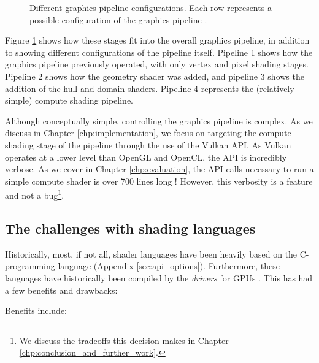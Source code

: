 \documentclass[a4paper,12pt,twoside,openright]{report}
\begin{document}
\begin{figure}[h]
\centering
\def\svgwidth{\linewidth}

\caption{Different graphics pipeline configurations. Each row represents a
possible configuration of the graphics pipeline
\cite{TripThroughGraphicsPipeline3}.}
\label{fig:graphics_pipeline_stages}
\end{figure}

Figure \ref{fig:graphics_pipeline_stages} shows how these stages fit into the
overall graphics pipeline, in addition to showing different configurations of
the pipeline itself. Pipeline 1 shows how the graphics pipeline previously
operated, with only vertex and pixel shading stages. Pipeline 2 shows how the
geometry shader was added, and pipeline 3 shows the addition of the hull and
domain shaders. Pipeline 4 represents the (relatively simple) compute shading
pipeline.

Although conceptually simple, controlling the graphics pipeline is complex. As
we discuss in Chapter \ref{chp:implementation}, we focus on targeting the
compute shading stage of the pipeline through the use of the Vulkan API. As
Vulkan operates at a lower level than OpenGL and OpenCL, the API is incredibly
verbose. As we cover in Chapter \ref{chp:evaluation}, the API calls necessary
to run a simple compute shader is over 700 lines long \cite{ProjectSource}!
However, this verbosity is a feature and not a bug\footnote{We discuss the
tradeoffs this decision makes in Chapter
\ref{chp:conclusion_and_further_work}\cite{TODO}.}.

\subsection{The challenges with shading languages}

\label{sec:shading_langauge_challenges}

Historically, most, if not all, shader languages have been heavily based on the
C-programming language (Appendix \ref{sec:api_options}). Furthermore, these
languages have historically been compiled by the \textit{drivers} for GPUs
\cite{TODO}. This has had a few benefits and drawbacks:

Benefits include:
\end{document}
